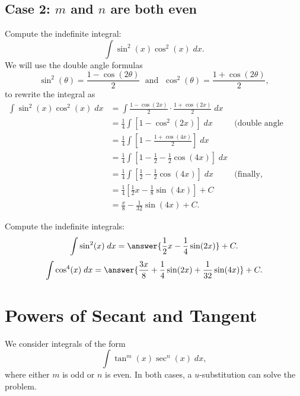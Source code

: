 \documentclass{ximera}
\begin{document}
\subsection{Case 2: $m$ and $n$ are both even}
\begin{example}
Compute the indefinite integral:
\[
\int \sin^2(x)\cos^2(x) \; dx.
\]
We will use the double angle formulas
\[
\sin^2(\theta) = \frac{1-\cos(2\theta)}{2} \; \text{ and } \; \cos^2(\theta) = \frac{1+\cos(2\theta)}{2},
\]
to rewrite the integral as
\begin{align*}
\int \sin^2(x)\cos^2(x) \; dx &= \int \frac{1-\cos(2x)}{2}\cdot \frac{1+\cos(2x)}{2} \; dx\\
  &= \frac14 \int \left[1 - \cos^2(2x)\right] \; dx &
  \text{(double angle formula again)}\\
  &= \frac14 \int \left[ 1- \frac{1+\cos(4x)}{2}\right] \; dx\\
  &= \frac14 \int \left[1-\frac12 - \frac12\cos(4x)\right] \; dx\\
  &= \frac14 \int \left[\frac12 - \frac12\cos(4x)\right] \; dx & \text{(finally, integrate)}\\
  &= \frac14 \left[\frac12 x  - \frac18\sin(4x)\right] + C\\
  &= \frac{x}{8}  - \frac{1}{32}\sin(4x) + C.
\end{align*}
\end{example}





\begin{problem}
Compute the indefinite integrals:
\[
\int \sin^2(x) \; dx = \answer{\frac12 x - \frac14 \sin(2x)} + C.
\]
\[
\int \cos^4(x) \; dx = \answer{\frac{3x}{8} +\frac14 \sin(2x) + \frac{1}{32}\sin(4x)} + C.
\]
\end{problem}

\section{Powers of Secant and Tangent}
We consider integrals of the form
\[
\int \tan^m(x)\sec^n(x) \; dx,
\]
where either $m$ is odd or $n$ is even. In both cases, a $u$-substitution
can solve the problem. 
\end{document}
